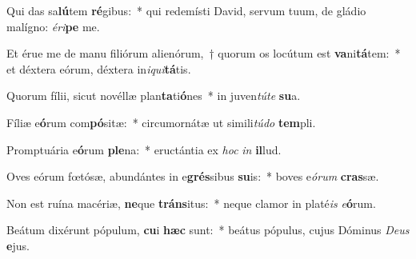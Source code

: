 \item Qui das sa\textbf{lú}tem \textbf{ré}gibus:~* qui redemísti David, servum tuum, de gládio malígno: \textit{é}\textit{ri}\textbf{pe} me.
\item Et érue me de manu filiórum alienórum,~† quorum os locútum est \textbf{va}ni\textbf{tá}tem:~* et déxtera eórum, déxtera in\textit{i}\textit{qui}\textbf{tá}tis.
\item Quorum fílii, sicut novéllæ plan\textbf{ta}ti\textbf{ó}nes~* in juven\textit{tú}\textit{te} \textbf{su}a.
\item Fíliæ e\textbf{ó}rum com\textbf{pó}sitæ:~* circumornátæ ut simili\textit{tú}\textit{do} \textbf{tem}pli.
\item Promptuária e\textbf{ó}rum \textbf{ple}na:~* eructántia ex \textit{hoc} \textit{in} \textbf{il}lud.
\item Oves eórum fœtósæ, abundántes in e\textbf{grés}sibus \textbf{su}is:~* boves e\textit{ó}\textit{rum} \textbf{cras}sæ.
\item Non est ruína macériæ, \textbf{ne}que \textbf{tráns}itus:~* neque clamor in platé\textit{is} \textit{e}\textbf{ó}rum.
\item Beátum dixérunt pópulum, \textbf{cu}i \textbf{hæc} sunt:~* beátus pópulus, cujus Dóminus \textit{De}\textit{us} \textbf{e}jus.
